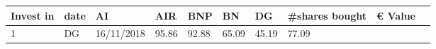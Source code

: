 \documentclass[
  11pt,
]{article}
\begin{document}
\begin{longtable}[]{@{}llllllllll@{}}
\begin{minipage}[b]{0.09\columnwidth}
Invest in\strut
\end{minipage} & \begin{minipage}[b]{0.10\columnwidth}\raggedright
date\strut
\end{minipage} & \begin{minipage}[b]{0.06\columnwidth}\raggedright
AI\strut
\end{minipage} & \begin{minipage}[b]{0.06\columnwidth}\raggedright
AIR\strut
\end{minipage} & \begin{minipage}[b]{0.06\columnwidth}\raggedright
BNP\strut
\end{minipage} & \begin{minipage}[b]{0.06\columnwidth}\raggedright
BN\strut
\end{minipage} & \begin{minipage}[b]{0.06\columnwidth}\raggedright
DG\strut
\end{minipage} & \begin{minipage}[b]{0.13\columnwidth}\raggedright
\#shares bought\strut
\end{minipage} & \begin{minipage}[b]{0.08\columnwidth}\raggedright
€ Value\strut
\end{minipage}\tabularnewline
\midrule
\endhead
\begin{minipage}[t]{0.04\columnwidth}\raggedright
1\strut
\end{minipage} & \begin{minipage}[t]{0.09\columnwidth}\raggedright
DG\strut
\end{minipage} & \begin{minipage}[t]{0.10\columnwidth}\raggedright
16/11/2018\strut
\end{minipage} & \begin{minipage}[t]{0.06\columnwidth}\raggedright
95.86\strut
\end{minipage} & \begin{minipage}[t]{0.06\columnwidth}\raggedright
92.88\strut
\end{minipage} & \begin{minipage}[t]{0.06\columnwidth}\raggedright
65.09\strut
\end{minipage} & \begin{minipage}[t]{0.06\columnwidth}\raggedright
45.19\strut
\end{minipage} & \begin{minipage}[t]{0.06\columnwidth}\raggedright
77.09\strut
\end{minipage} & \begin{minipage}[t]{0.13\columnwidth}\raggedright

\end{minipage}
\end{longtable}
\end{document}
